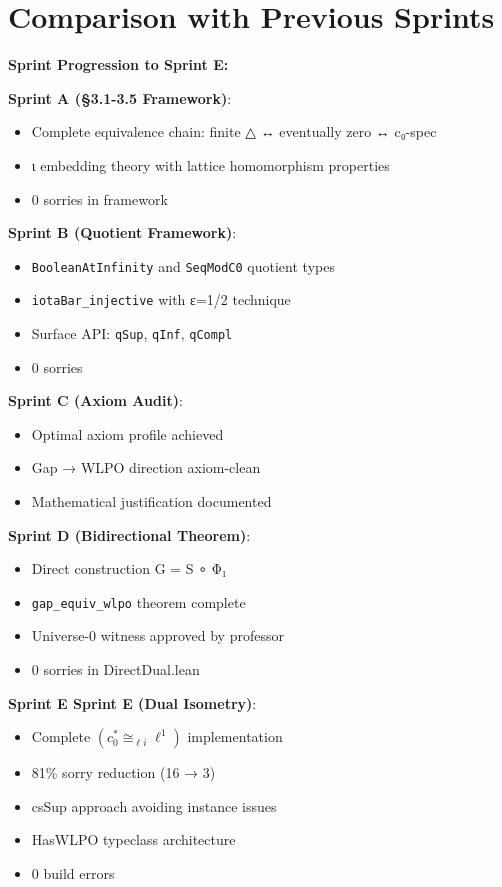 \documentclass[11pt]{article}
\theoremstyle{definition}
\theoremstyle{remark}
\newcommand{\sprintE}{\textcolor{orange!70!black}{\textbf{Sprint E}}}
\begin{document}
\section{Comparison with Previous Sprints}\label{sec:comparison}

\begin{mdframed}[style=sprintbox]
\textbf{Sprint Progression to Sprint E:}

\textbf{Sprint A (§3.1-3.5 Framework)}:
\begin{itemize}
\item Complete equivalence chain: finite △ ↔ eventually zero ↔ c₀-spec
\item ι embedding theory with lattice homomorphism properties
\item 0 sorries in framework
\end{itemize}

\textbf{Sprint B (Quotient Framework)}:
\begin{itemize}
\item \texttt{BooleanAtInfinity} and \texttt{SeqModC0} quotient types
\item \texttt{iotaBar\_injective} with ε=1/2 technique
\item Surface API: \texttt{qSup}, \texttt{qInf}, \texttt{qCompl}
\item 0 sorries
\end{itemize}

\textbf{Sprint C (Axiom Audit)}:
\begin{itemize}
\item Optimal axiom profile achieved
\item Gap → WLPO direction axiom-clean
\item Mathematical justification documented
\end{itemize}

\textbf{Sprint D (Bidirectional Theorem)}:
\begin{itemize}
\item Direct construction G = S ∘ Φ₁
\item \texttt{gap\_equiv\_wlpo} theorem complete
\item Universe-0 witness approved by professor
\item 0 sorries in DirectDual.lean
\end{itemize}

\textbf{\sprintE{} Sprint E (Dual Isometry)}:
\begin{itemize}
\item Complete $(c_0^* \cong_{\ell i} \ell^1)$ implementation
\item 81\% sorry reduction (16 → 3)
\item csSup approach avoiding instance issues
\item HasWLPO typeclass architecture
\item 0 build errors
\end{itemize}
\end{mdframed}
\end{document}
